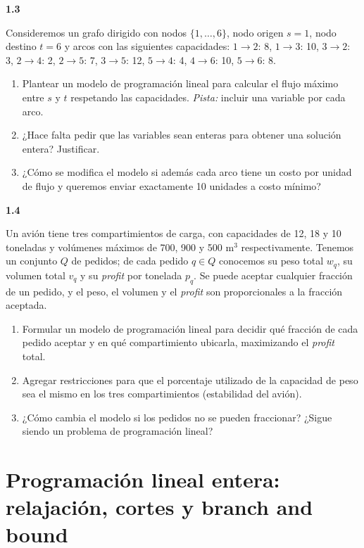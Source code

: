\documentclass[11pt,a4paper]{article}
\newcommand{\ejercicio}[1]{\par\medskip\noindent\textbf{#1}\par\nopagebreak\smallskip}
\begin{document}
\ejercicio{1.3}
Consideremos un grafo dirigido con nodos $\{1,\dots,6\}$, nodo origen $s = 1$,
nodo destino $t = 6$ y arcos con las siguientes capacidades:
$1\!\to\!2$: 8, $1\!\to\!3$: 10, $3\!\to\!2$: 3, $2\!\to\!4$: 2, $2\!\to\!5$: 7,
$3\!\to\!5$: 12, $5\!\to\!4$: 4, $4\!\to\!6$: 10, $5\!\to\!6$: 8.
\begin{enumerate}
  \item Plantear un modelo de programación lineal para calcular el flujo máximo
  entre $s$ y $t$ respetando las capacidades. \emph{Pista:} incluir una variable
  por cada arco.
  \item ¿Hace falta pedir que las variables sean enteras para obtener una
  solución entera? Justificar.
  \item ¿Cómo se modifica el modelo si además cada arco tiene un costo por
  unidad de flujo y queremos enviar exactamente 10 unidades a costo mínimo?
\end{enumerate}

\ejercicio{1.4}
Un avión tiene tres compartimientos de carga, con capacidades de 12, 18 y 10
toneladas y volúmenes máximos de 700, 900 y 500 m$^3$ respectivamente. Tenemos
un conjunto $Q$ de pedidos; de cada pedido $q \in Q$ conocemos su peso total
$w_q$, su volumen total $v_q$ y su \emph{profit} por tonelada $p_q$. Se puede
aceptar cualquier fracción de un pedido, y el peso, el volumen y el
\emph{profit} son proporcionales a la fracción aceptada.
\begin{enumerate}
  \item Formular un modelo de programación lineal para decidir qué fracción de
  cada pedido aceptar y en qué compartimiento ubicarla, maximizando el
  \emph{profit} total.
  \item Agregar restricciones para que el porcentaje utilizado de la capacidad
  de peso sea el mismo en los tres compartimientos (estabilidad del avión).
  \item ¿Cómo cambia el modelo si los pedidos no se pueden fraccionar?
  ¿Sigue siendo un problema de programación lineal?
\end{enumerate}

\section{Programación lineal entera: relajación, cortes y branch and bound}
\end{document}
